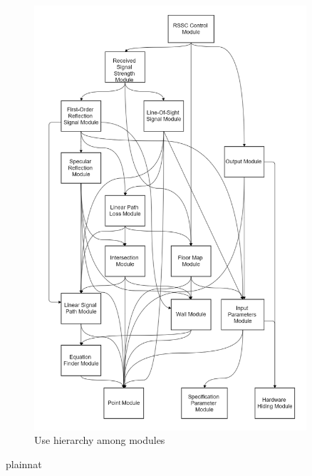 \documentclass[12pt, titlepage]{article}
\begin{document}
\begin{figure}[H]
\centering
\includegraphics[width=0.9\textwidth]{uses_hierarchy.png}
\caption{Use hierarchy among modules}
\label{FigUH}
\end{figure}


\newpage
 {plainnat}

\end{document}
